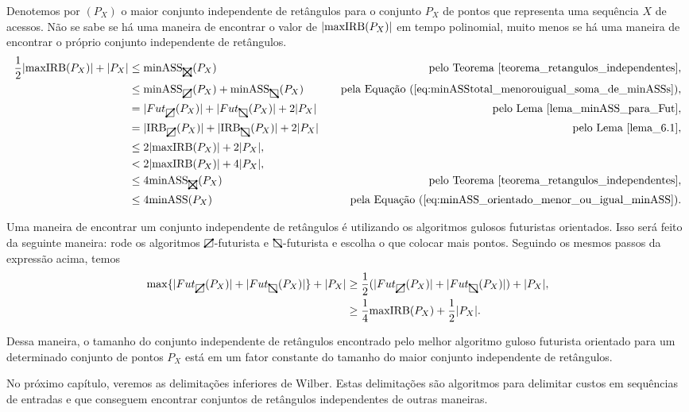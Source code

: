 Denotemos por \maxIRB$(P_X)$ o maior conjunto independente de retângulos para o conjunto $P_X$ de pontos que representa uma sequência $X$ de acessos. Não se sabe se há uma maneira de encontrar o valor de $|\mathrm{maxIRB}(P_X)|$ em tempo polinomial, muito menos se há uma maneira de encontrar o próprio conjunto independente de retângulos.
\begin{align*}
    \frac{1}{2}|\maxIRB(P_X)| + |P_X| &\leq \minASS_{\recttotal}(P_X) \quad & \text{pelo Teorema~\ref{teorema_retangulos_independentes}},\\
    &\leq \minASS_{\rectpos}(P_X) + \minASS_{\rectneg}(P_X) \quad & \text{pela Equação~(\ref{eq:minASStotal_menorouigual_soma_de_minASSs})},\\
    &= |Fut_{\rectpos}(P_X)| + |Fut_{\rectneg}(P_X)| + 2|P_X| \quad & \text{pelo Lema~\ref{lema_minASS_para_Fut}},\\
    &= |\text{IRB}_{\rectpos}(P_X)| + |\text{IRB}_{\rectneg}(P_X)| + 2|P_X| \quad & \text{pelo Lema~\ref{lema_6.1}},\\
    &\leq 2|\maxIRB(P_X)| + 2|P_X|,\\
    &< 2|\maxIRB(P_X)| + 4|P_X|,\\
    &\leq 4\minASS_{\recttotal}(P_X) \quad & \text{pelo Teorema~\ref{teorema_retangulos_independentes}},\\
    &\leq 4\minASS(P_X) \quad & \text{pela Equação~(\ref{eq:minASS_orientado_menor_ou_igual_minASS})}.
\end{align*}

Uma maneira de encontrar um conjunto independente de retângulos é utilizando os algoritmos gulosos futuristas orientados. Isso será feito da seguinte maneira: rode os algoritmos $\rectpos$-futurista e $\rectneg$-futurista e escolha o que colocar mais pontos. Seguindo os mesmos passos da expressão acima, temos
\begin{align*}
    \max\{|Fut_{\rectpos}(P_X)| + |Fut_{\rectneg}(P_X)|\} + |P_X| &\geq \frac{1}{2}(|Fut_{\rectpos}(P_X)| + |Fut_{\rectneg}(P_X)|) + |P_X|,\\
    &\geq \frac{1}{4}\maxIRB(P_X) + \frac{1}{2}|P_X|.
\end{align*}

Dessa maneira, o tamanho do conjunto independente de retângulos encontrado pelo melhor algoritmo guloso futurista orientado para um determinado conjunto de pontos $P_X$ está em um fator constante do tamanho do maior conjunto independente de retângulos.

No próximo capítulo, veremos as delimitações inferiores de Wilber. Estas delimitações são algoritmos para delimitar custos em sequências de entradas e que conseguem encontrar conjuntos de retângulos independentes de outras maneiras. 